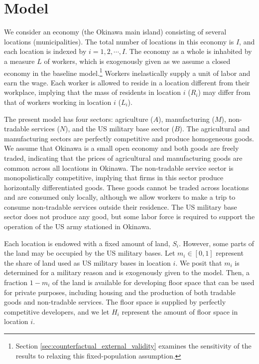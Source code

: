 \documentclass[12pt, unicode, a4paper]{article}
\newcommand{\1}{\mbox{1}\hspace{-0.25em}\mbox{l}} %
\begin{document}



\section{Model}
\label{sec:model}
We consider an economy (the Okinawa main island) consisting of several locations (municipalities). The total number of locations in this economy is $I$, and each location is indexed by $i=1,2,\cdots,I$. The economy as a whole is inhabited by a measure $L$ of workers, which is exogenously given as we assume a closed economy in the baseline model.\footnote{Section \ref{sec:counterfactual_external_validity} examines the sensitivity of the results to relaxing this fixed-population assumption.}
Workers inelastically supply a unit of labor and earn the wage. Each worker is allowed to reside in a location different from their workplace, implying that the mass of residents in location $i$ ($R_i$) may differ from that of workers working in location $i$ ($L_i$).

The present model has four sectors: agriculture ($A$), manufacturing ($M$), non-tradable services ($N$), and the US military base sector ($B$).
The agricultural and manufacturing sectors are perfectly competitive and produce homogeneous goods. We assume that Okinawa is a small open economy and both goods are freely traded, indicating that the prices of agricultural and manufacturing goods are common across all locations in Okinawa. The non-tradable service sector is monopolistically competitive, implying that firms in this sector produce horizontally differentiated goods. These goods cannot be traded across locations and are consumed only locally, although we allow workers to make a trip to consume non-tradable services outside their residence. 
The US military base sector does not produce any good, but some labor force is required to support the operation of the US army stationed in Okinawa.

Each location is endowed with a fixed amount of land, $S_i$. However, some parts of the land may be occupied by the US military bases. Let $m_i \in [0,1]$ represent the share of land used as US military bases in location $i$. We posit that $m_i$ is determined for a military reason and is exogenously given to the model. Then, a fraction $1-m_i$ of the land is available for developing floor space that can be used for private purposes, including housing and the production of both tradable goods and non-tradable services. The floor space is supplied by perfectly competitive developers, and we let $H_i$ represent the amount of floor space in location $i$.
\end{document}
